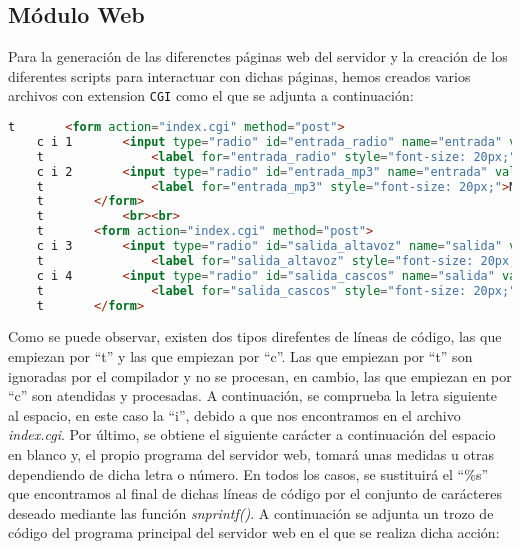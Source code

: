 \subsection{Módulo Web}
\label{subsec:modulo-web}
Para la generación de las diferenctes páginas web del servidor y la creación de los diferentes scripts para interactuar con dichas páginas, hemos creados varios archivos con extension \texttt{CGI} como el que se adjunta a continuación:

\begin{lstlisting}[captionpos=b, caption={Ejemplo archivo .CGI}, language=html]
    t       <form action="index.cgi" method="post">
    c i 1       <input type="radio" id="entrada_radio" name="entrada" value="radio" OnClick="submit();" %s>
    t               <label for="entrada_radio" style="font-size: 20px;">Radio</label>
    c i 2       <input type="radio" id="entrada_mp3" name="entrada" value="mp3" OnClick="submit();" %s>
    t               <label for="entrada_mp3" style="font-size: 20px;">MP3</label>
    t       </form>
    t           <br><br>
    t       <form action="index.cgi" method="post">
    c i 3       <input type="radio" id="salida_altavoz" name="salida" value="altavoz" OnClick="submit();" %s>
    t               <label for="salida_altavoz" style="font-size: 20px;">Altavoz</label>
    c i 4       <input type="radio" id="salida_cascos" name="salida" value="cascos" OnClick="submit();" %s>
    t               <label for="salida_cascos" style="font-size: 20px;">Cascos</label>
    t       </form>
    \end{lstlisting}

Como se puede observar, existen dos tipos direfentes de líneas de código, las que empiezan por ``t'' y las que empiezan por ``c''. Las que empiezan por ``t'' son ignoradas por el compilador y no se procesan, en cambio, las que empiezan en  por ``c'' son atendidas y procesadas. A continuación, se comprueba la letra siguiente al espacio, en este caso la ``i'', debido a que nos encontramos en el archivo \textit{index.cgi}. Por último, se obtiene el siguiente carácter a continuación del espacio en blanco y, el propio programa del servidor web, tomará unas medidas u otras dependiendo de dicha letra o número. En todos los casos, se sustituirá el ``\%s'' que encontramos al final de dichas líneas de código por el conjunto de carácteres deseado mediante las función \textit{snprintf()}. A continuación se adjunta un trozo de código del programa principal del servidor web en el que se realiza dicha acción:

